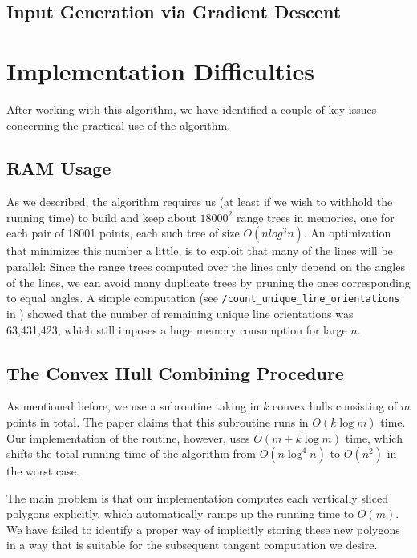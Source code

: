 \documentclass{article}
\begin{document}
\subsection{Input Generation via Gradient Descent}


\section{Implementation Difficulties}

After working with this algorithm, we have identified a couple of key issues concerning the practical use of the algorithm.

\subsection{RAM Usage}

As we described, the algorithm requires us (at least if we wish to withhold the running time) to build and keep about $18000^2$ range trees in memories, one for each pair of 18001 points, each such tree of size $O(n log^3 n)$. An optimization that minimizes this number a little, is to exploit that many of the lines will be parallel: Since the range trees computed over the lines only depend on the angles of the lines, we can avoid many duplicate trees by pruning the ones corresponding to equal angles. A simple computation (see \texttt{/count\_unique\_line\_orientations} in \cite{hm18}) showed that the number of remaining unique line orientations was 63,431,423, which still imposes a huge memory consumption for large $n$.

\subsection{The Convex Hull Combining Procedure}

As mentioned before, we use a subroutine taking in $k$ convex hulls consisting of $m$ points in total. The paper claims that this subroutine runs in $O(k \log m)$ time. Our implementation of the routine, however, uses $O(m + k\log m)$ time, which shifts the total running time of the algorithm from $O(n \log^4 n)$ to $O(n^2)$ in the worst case.

The main problem is that our implementation computes each vertically sliced polygons explicitly, which automatically ramps up the running time to $O(m)$. We have failed to identify a proper way of implicitly storing these new polygons in a way that is suitable for the subsequent tangent computation we desire. 
\end{document}
